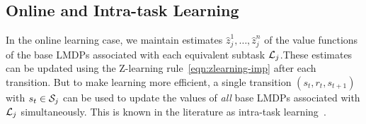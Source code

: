\subsection{Online and Intra-task Learning}


In the online learning case, we maintain estimates $\widehat{z}_j^1,\ldots,\widehat{z}_j^n$ of the value functions of the base LMDPs associated with each equivalent subtask $\mathcal{L}_j$.These estimates can be updated using the Z-learning rule~\eqref{eqn:zlearning-imp} after each transition.
But to make learning more efficient, a single transition $(s_t,r_t,s_{t+1})$ with $s_t\in\mathcal{S}_j$ can be used to update the values of {\em all} base LMDPs associated with $\mathcal{L}_j$ simultaneously. This is known in the literature as intra-task learning~\citep{Kaelbling1993,Jonsson2016}.


